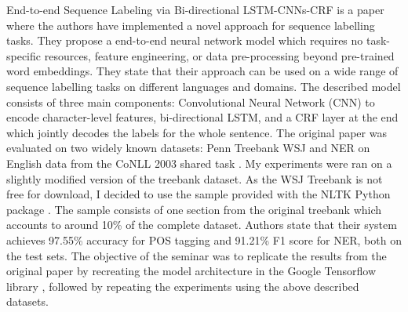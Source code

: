 End-to-end Sequence Labeling via Bi-directional LSTM-CNNs-CRF \cite{ma2016end} is a
paper where the authors have implemented a novel approach for sequence labelling tasks.
They propose a end-to-end neural network model which requires no task-specific
resources, feature engineering, or data pre-processing beyond pre-trained word
embeddings. They state that their approach can be used on a wide range of
sequence labelling tasks on different languages and domains. The described model
consists of three main components: Convolutional Neural Network
(CNN) \cite{lecun1989backpropagation} to encode character-level features, bi-directional
LSTM, and a CRF layer at the end which jointly decodes the labels
for the whole sentence. The original paper was evaluated on two widely known
datasets: Penn Treebank WSJ \cite{marcus1993building} and NER on English data
from the CoNLL 2003 shared task \cite{tjong2003introduction}. My experiments
were ran on a slightly
modified version of the treebank dataset. As the WSJ Treebank is not free for
download, I decided to use the sample provided with the NLTK Python
package \cite{bird2006nltk}. The sample consists of one section from the original
treebank which accounts to around 10\% of the complete dataset.
Authors state that their system achieves 97.55\% accuracy for POS tagging
and 91.21\% F1 score for NER, both on the test sets. The objective of the seminar
was to replicate the results from the original paper by recreating the
model architecture in the Google Tensorflow library \cite{abadi2016tensorflow},
followed by repeating the experiments using the above described datasets.



